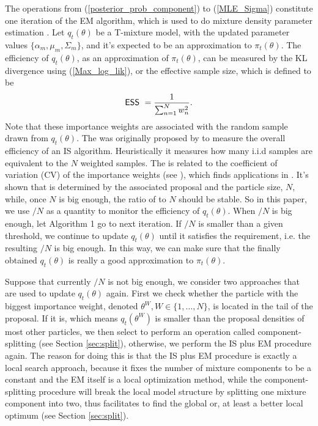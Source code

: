 The operations from (\ref{posterior_prob_component}) to
(\ref{MLE_Sigma}) constitute one iteration of the EM algorithm,
which is used to do mixture density parameter estimation
\citep{peel2000rmm}. Let $q_t(\theta)$ be a T-mixture model, with
the updated parameter values $\{\alpha_m,\mu_m,\Sigma_m\}$, and it's
expected to be an approximation to $\pi_t(\theta)$. The efficiency
of $q_t(\theta)$, as an approximation of $\pi_t(\theta)$, can be
measured by the KL divergence using (\ref{Max_log_lik}), or the
effective sample size, which is defined to be
\begin{equation}\label{ESS}
\ESS=\frac{1}{\sum_{n=1}^N w_n^2}.
\end{equation}
Note that these importance weights are associated with the random
sample drawn from $q_t(\theta)$. The \ESS was originally proposed by
\cite{kong1994sequential} to measure the overall efficiency of an IS
algorithm. Heuristically it measures how many i.i.d samples are
equivalent to the $N$ weighted samples. The \ESS is related to the
coefficient of variation (CV) of the importance weights (see
\cite{kong1994sequential}), which finds applications in
\cite{ardia2008adaptive,cappe2008ais,cornebise2008adaptive}. It's
shown that \ESS is determined by the associated proposal and the
particle size, $N$, while, once $N$ is big enough, the ratio of \ESS
to $N$ should be stable. So in this paper, we use \ESS$/N$ as a
quantity to monitor the efficiency of $q_t(\theta)$. When \ESS$/N$
is big enough, let Algorithm 1 go to next iteration. If \ESS$/N$ is
smaller than a given threshold, we continue to update $q_t(\theta)$
until it satisfies the requirement, i.e. the resulting \ESS$/N$ is
big enough. In this way, we can make sure that the finally obtained
$q_t(\theta)$ is really a good approximation to $\pi_t(\theta)$.

Suppose that currently \ESS$/N$ is not big enough, we consider two
approaches that are used to update $q_t(\theta)$ again. First we
check whether the particle with the biggest importance weight,
denoted $\theta^{W}, W\in\{1,\ldots,N\}$, is located in the tail of
the proposal. If it is, which means $q_t(\theta^{W})$ is smaller
than the proposal densities of most other particles, we then select
to perform an operation called component-splitting (see Section
\ref{sec:split}), otherwise, we perform the IS plus EM procedure
again. The reason for doing this is that the IS plus EM procedure is
exactly a local search approach, because it fixes the number of
mixture components to be a constant and the EM itself is a local
optimization method, while the component-splitting procedure will
break the local model structure by splitting one mixture component
into two, thus facilitates to find the global or, at least a better
local optimum (see Section \ref{sec:split}).


